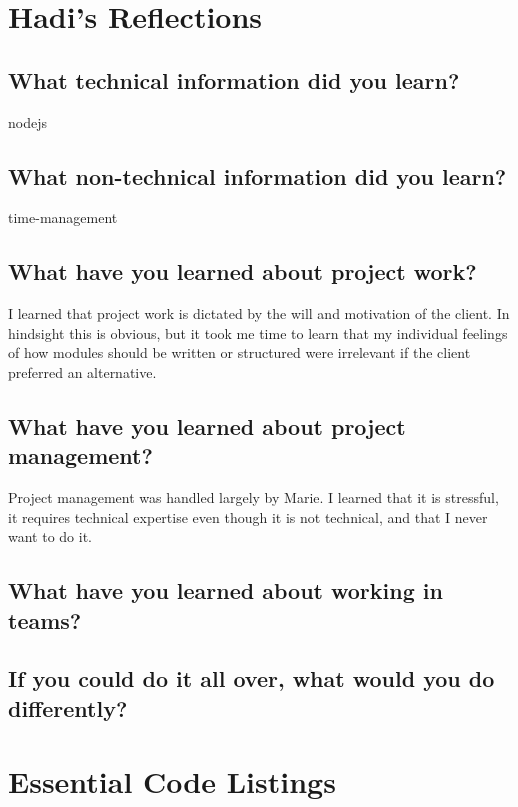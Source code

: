 \documentclass[onecolumn, draftclsnofoot,10pt, compsoc]{report}
\begin{document}
\section{Hadi's Reflections}
\subsection{What technical information did you learn?}
nodejs
\subsection{What non-technical information did you learn?}
time-management
\subsection{What have you learned about project work?}
I learned that project work is dictated by the will and motivation of the client. In hindsight this is obvious, but it took me time to learn that my individual feelings of how modules should be written or structured were irrelevant if the client preferred an alternative.
\subsection{What have you learned about project management?}
Project management was handled largely by Marie. I learned that it is stressful, it requires technical expertise even though it is not technical, and that I never want to do it.
\subsection{What have you learned about working in teams?}
\subsection{If you could do it all over, what would you do differently?}

\appendix
\minitoc
\section{Essential Code Listings}
\end{document}
